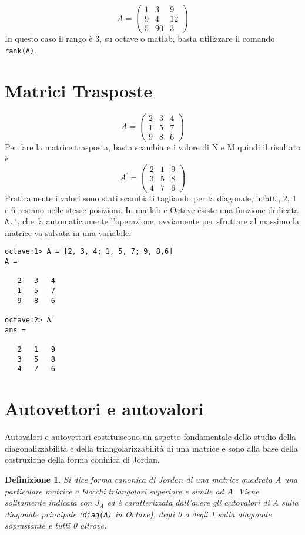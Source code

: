 \documentclass{book}
\newtheorem{defi}{Definizione}[section]
\begin{document}
\begin{equation*}
  A=\begin{pmatrix}
      1 & 3 & 9\\
      9 & 4 & 12\\
      5 & 90 & 3
  \end{pmatrix}
\end{equation*}
In questo caso il rango è 3, su octave o matlab, basta utilizzare il comando
\lstinline|rank(A)|.\\

\section{Matrici Trasposte}
\label{sec:matt}
\begin{equation*}
  A = \begin{pmatrix}
    2 & 3 & 4\\
    1 & 5 & 7\\
    9 & 8 & 6        
  \end{pmatrix}
\end{equation*}
Per fare la matrice trasposta, basta scambiare i valore di N e M quindi il risultato è
\begin{equation*}
  A^\prime=
  \begin{pmatrix}
    2  & 1 &  9\\
    3  & 5 &  8\\
    4  & 7 &  6
  \end{pmatrix}
\end{equation*}
Praticamente i valori sono stati scambiati tagliando per la diagonale,
infatti, 2, 1 e 6 restano nelle stesse posizioni. In matlab e Octave esiste una
funzione dedicata \lstinline|A.'|, che fa automaticamente l'operazione,
ovviamente per sfruttare al massimo la matrice va salvata in una variabile.
\begin{verbatim}
octave:1> A = [2, 3, 4; 1, 5, 7; 9, 8,6]
A =

   2   3   4
   1   5   7
   9   8   6

octave:2> A'
ans =

   2   1   9
   3   5   8
   4   7   6
\end{verbatim}

\section{Autovettori e autovalori}
\label{sec:autovettorieautovalori}

Autovalori e autovettori costituiscono un aspetto fondamentale dello studio della
diagonalizzabilità e della triangolarizzabilità di una matrice e sono alla base
della costruzione della forma coninica di Jordan.
\begin{defi}
  Si dice forma canonica di Jordan di una matrice quadrata A una particolare matrice a
  blocchi triangolari superiore e simile ad $A$. Viene solitamente indicata con $J_A$ ed
  è caratterizzata dall'avere gli autovalori di A sulla diagonale principale
  (\lstinline|diag(A)| in Octave), degli 0 o degli 1 sulla diagonale soprastante e tutti
  0 altrove. 
\end{defi}
\end{document}

